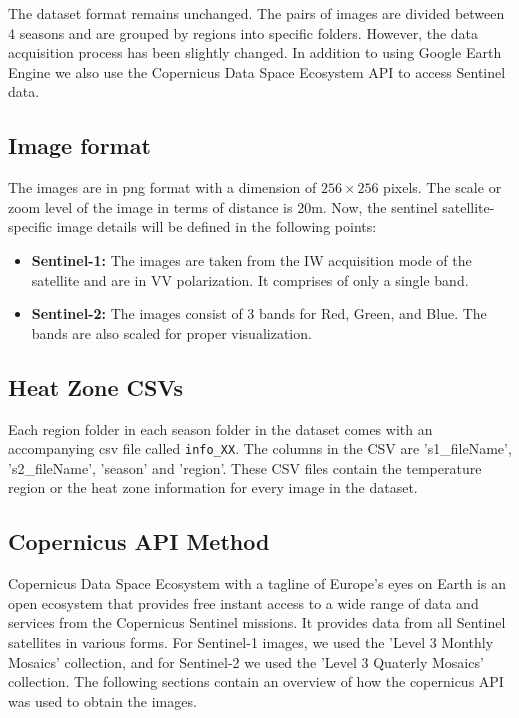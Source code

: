 The dataset format remains unchanged. The pairs of images are divided between 4 seasons and are grouped by regions into specific folders. However, the data acquisition process has been slightly changed. In addition to using Google Earth Engine\cite{GORELICK201718} we also use the Copernicus Data Space Ecosystem API to access Sentinel data.

\subsection{Image format}
The images are in png format with a dimension of $256\times256$ pixels. The scale or zoom level of the image in terms of distance is 20m. Now, the sentinel satellite-specific image details will be defined in the following points:
\begin{itemize}
    \item \textbf{Sentinel-1:} The images are taken from the IW acquisition mode of the satellite and are in VV polarization. It comprises of only a single band.
    \item \textbf{Sentinel-2:} The images consist of 3 bands for Red, Green, and Blue. The bands are also scaled for proper visualization.
\end{itemize}

\subsection{Heat Zone CSVs}
Each region folder in each season folder in the dataset comes with an accompanying csv file called \texttt{info\_XX}. The columns in the CSV are 's1\_fileName', 's2\_fileName', 'season' and 'region'. These CSV files contain the temperature region or the heat zone information for every image in the dataset.

\subsection{Copernicus API Method}
Copernicus Data Space Ecosystem with a tagline of Europe's eyes on Earth is an open ecosystem that provides free instant access to a wide range of data and services from the Copernicus Sentinel missions\cite{copernicusHome}. It provides data from all Sentinel satellites in various forms. For Sentinel-1 images, we used the 'Level 3 Monthly Mosaics' collection, and for Sentinel-2 we used the 'Level 3 Quaterly Mosaics' collection.
The following sections contain an overview of how the copernicus API was used to obtain the images.

